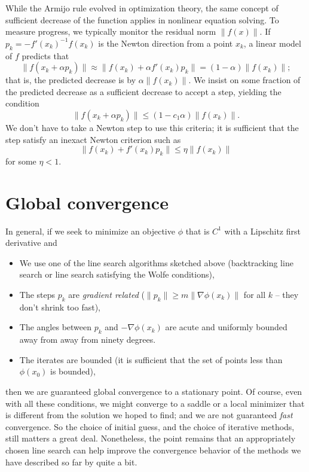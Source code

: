 \documentclass[12pt, leqno]{article} %
\providecommand{\tightlist}{%
  \setlength{\itemsep}{0pt}\setlength{\parskip}{0pt}}
\begin{document}
While the Armijo rule evolved in optimization theory, the same concept
of sufficient decrease of the function applies in nonlinear equation
solving. To measure progress, we typically monitor the residual norm
\(\|f(x)\|\). If \(p_k = -f'(x_k)^{-1} f(x_k)\) is the Newton direction
from a point \(x_k\), a linear model of \(f\) predicts that
\[\|f(x_k + \alpha p_k)\| \approx
  \|f(x_k) + \alpha f'(x_k) p_k\| =
  (1-\alpha) \|f(x_k)\|;\] that is, the predicted decrease is by
\(\alpha \|f(x_k)\|\). We insist on some fraction of the predicted
decrease as a sufficient decrease to accept a step, yielding the
condition \[\|f(x_k + \alpha p_k)\| \leq (1-c_1 \alpha) \|f(x_k)\|.\] We
don't have to take a Newton step to use this criteria; it is sufficient
that the step satisfy an inexact Newton criterion such as
\[\|f(x_k) + f'(x_k) p_k\| \leq \eta \|f(x_k)\|\] for some \(\eta < 1\).

\section{Global convergence}

In general, if we seek to minimize an objective \(\phi\) that is \(C^1\)
with a Lipschitz first derivative and

\begin{itemize}
\tightlist
\item
  We use one of the line search algorithms sketched above (backtracking
  line search or line search satisfying the Wolfe conditions),
\item
  The steps \(p_k\) are \emph{gradient related}
  (\(\|p_k\| \geq m \|\nabla \phi(x_k)\|\) for all \(k\) -- they don't
  shrink too fast),
\item
  The angles between \(p_k\) and \(-\nabla \phi(x_k)\) are acute and
  uniformly bounded away from away from ninety degrees.
\item
  The iterates are bounded (it is sufficient that the set of points less
  than \(\phi(x_0)\) is bounded),
\end{itemize}

then we are guaranteed global convergence to a stationary point. Of
course, even with all these conditions, we might converge to a saddle or
a local minimizer that is different from the solution we hoped to find;
and we are not guaranteed \emph{fast} convergence. So the choice of
initial guess, and the choice of iterative methods, still matters a
great deal. Nonetheless, the point remains that an appropriately chosen
line search can help improve the convergence behavior of the methods we
have described so far by quite a bit.
\end{document}
